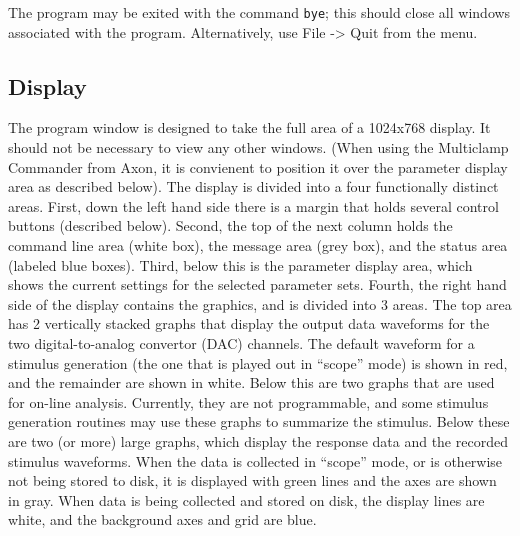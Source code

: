 \documentclass[11pt, letterpaper, titlepage]{paper}
\begin{document}
 The program may be 
exited with the command \texttt{bye}; this should close all 
windows associated with the program. Alternatively, use File -> Quit from the menu.

\subsection{Display}
The program window is designed to take the full area of a 1024x768 
display. It should not be necessary  to 
view any other windows. (When using the Multiclamp Commander from Axon, it is convienent to position it
over the parameter display area as described below). The display is divided into a four 
functionally distinct areas. First, down the left hand side there 
is a margin that holds several control buttons (described below). 
Second, the top of the next column holds the command line area 
(white box), the message area (grey box), and the status area 
(labeled blue boxes). Third, below this is the parameter display 
area,
 which shows the current settings for the selected parameter sets. 
 Fourth, the right hand side of the display 
contains the graphics, and is divided into 3 areas. The top area 
has 2 vertically stacked graphs that display the output data 
waveforms for the two digital-to-analog convertor (DAC) channels. 
The default waveform for a stimulus generation (the one that is 
played out in ``scope'' mode) is shown in red, and the remainder 
are shown in white. Below this are two graphs that are used for 
on-line analysis. Currently, they are not programmable, and some 
stimulus generation routines may use these graphs to summarize the 
stimulus. Below these are two (or more) large graphs, which 
display the response data and the recorded stimulus waveforms. 
When the data is collected in ``scope'' mode, or is otherwise not 
being stored to disk, it is displayed with green lines and the 
axes are shown in gray. When data is being collected and stored on 
disk, the display lines are white, and the background axes and 
grid are blue.
\end{document}

